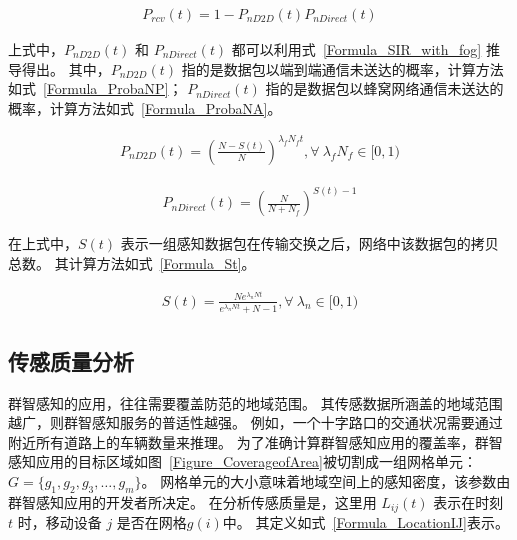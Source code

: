 \begin{equation}
\label{Formula_ProbaRcvT}
\begin{aligned}
P_{rcv}(t) = 1 - P_{nD2D}(t) P_{nDirect}(t)
\end{aligned}
\end{equation}

上式中，$P_{nD2D}(t)$ 和 $P_{nDirect}(t)$ 都可以利用式~\eqref{Formula_SIR_with_fog} 推导得出。
其中，$P_{nD2D}(t)$ 指的是数据包以端到端通信未送达的概率，计算方法如式~\eqref{Formula_ProbaNP}；
$P_{nDirect}(t)$ 指的是数据包以蜂窝网络通信未送达的概率，计算方法如式~\eqref{Formula_ProbaNA}。

\begin{equation}
  \label{Formula_ProbaNP}
  \begin{aligned}
  P_{nD2D}(t) = (\frac{N-S(t)}{N})^{\lambda_f N_f t}, \forall \ \lambda_f N_f \in [0,1)
  \end{aligned}
\end{equation}

\begin{equation}
  \label{Formula_ProbaNA}
  \begin{aligned}
  P_{nDirect}(t) = (\frac{N}{N + N_f})^{S(t)-1}
  \end{aligned}
\end{equation}

在上式中，$S(t)$ 表示一组感知数据包在传输交换之后，网络中该数据包的拷贝总数。
其计算方法如式~\eqref{Formula_St}。

\begin{equation}
\label{Formula_St}
  \begin{aligned}
    S(t) = \frac{N e^{\lambda_n N t}}{e^{\lambda_n N t} + N -1}, \forall \ \lambda_n \in [0,1)
  \end{aligned}
\end{equation}

\subsection{传感质量分析}

群智感知的应用，往往需要覆盖防范的地域范围。
其传感数据所涵盖的地域范围越广，则群智感知服务的普适性越强。
例如，一个十字路口的交通状况需要通过附近所有道路上的车辆数量来推理。
为了准确计算群智感知应用的覆盖率，群智感知应用的目标区域如图~\ref{Figure_CoverageofArea}被切割成一组网格单元：$G = \{g_1,g_2,g_3,\ldots,g_m\}$。
网格单元的大小意味着地域空间上的感知密度，该参数由群智感知应用的开发者所决定。
在分析传感质量是，这里用 $L_{ij}(t)$ 表示在时刻 $t$ 时，移动设备 $j$ 是否在网格$g(i)$中。
其定义如式~\eqref{Formula_LocationIJ}表示。

